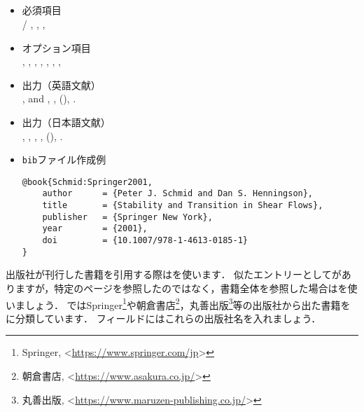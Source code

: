 \documentclass[a4paper,fleqn,uplatex,dvipdfmx]{jsarticle}
\begin{document}
\subsection{\ttbook}
\label{ssec:book}
\begin{screen}
    \begin{itemize}
        \item 必須項目 \\
        \ttauthor / \tteditor, \tttitle, \ttpublisher, \ttyear
        \item オプション項目 \\
        \ttvolume, \ttnumber, \ttseries, \ttaddress, \ttedition, \ttmonth, \ttnote, \ttkey
        \item 出力（英語文献） \\
            \colorbox[gray]{0.8}{\ttauthorf}, \colorbox[gray]{0.8}{\ttauthors} and \colorbox[gray]{0.8}{\ttauthort}, \colorbox[gray]{0.8}{\tttitle}, \colorbox[gray]{0.8}{\ttpublisher} (\colorbox[gray]{0.8}{\ttyear}), \colorbox[gray]{0.8}{\ttnote}.
        \item 出力（日本語文献） \\
            \colorbox[gray]{0.8}{\ttauthorf}, \colorbox[gray]{0.8}{\ttauthors}, \colorbox[gray]{0.8}{\ttauthort}, \colorbox[gray]{0.8}{\tttitle}, \colorbox[gray]{0.8}{\ttpublisher} (\colorbox[gray]{0.8}{\ttyear}), \colorbox[gray]{0.8}{\ttnote}.
        \item \verb|bib|ファイル作成例 \vspace{-3mm}
\begin{verbatim}
@book{Schmid:Springer2001,
    author      = {Peter J. Schmid and Dan S. Henningson},
    title       = {Stability and Transition in Shear Flows},
    publisher   = {Springer New York},
    year        = {2001},
    doi         = {10.1007/978-1-4613-0185-1}
}
\end{verbatim}
    \end{itemize}
\end{screen}

出版社が刊行した書籍を引用する際は\ttbook を使います．
似たエントリーとして\hyperref[ssec:inbook]{\ttinbook}がありますが，特定のページを参照したのではなく，書籍全体を参照した場合は\ttbook を使いましょう．
\JSMErepos ではSpringer\footnote{Springer, \textless\url{https://www.springer.com/jp}\textgreater}や朝倉書店\footnote{朝倉書店, \textless\url{https://www.asakura.co.jp/}\textgreater}，丸善出版\footnote{丸善出版, \textless\url{https://www.maruzen-publishing.co.jp/}\textgreater}等の出版社から出た書籍を\ttbook に分類しています．
\ttpublisher フィールドにはこれらの出版社名を入れましょう．
\end{document}
